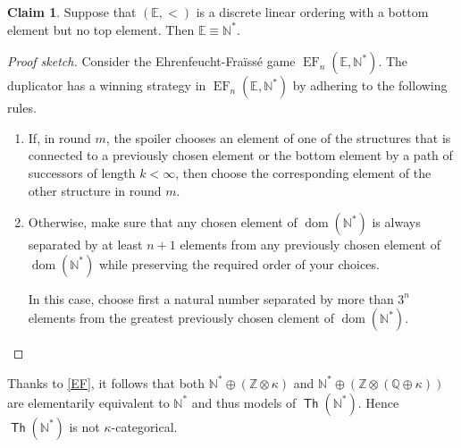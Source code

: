 \documentclass[10pt,letterpaper,cm]{nupset}
\theoremstyle{definition}
\theoremstyle{theorem}
\newtheorem{claim}{Claim}
\theoremstyle{remark}
\newcommand{\E}{\mathbb E}
\newcommand{\N}{\mathbb N}
\newcommand{\Q}{\mathbb Q}
\newcommand{\Z}{\mathbb Z}
\newcommand{\1}{\mathbb{1}}
\renewcommand{\i}{\vec i}
\newcommand{\0}{\vec 0}
\DeclareMathOperator{\dom}{dom}
\DeclareMathOperator{\ef}{EF}
\DeclareMathOperator{\thh}{\mathsf{Th}}
\begin{document}
\begin{solution}
\begin{claim}
Suppose that $\left(\E, <\right)$ is a discrete linear ordering with a bottom element but no top element. Then $\E \equiv \N^{\ast}$.
\end{claim}
\begin{proof}[Proof sketch]
Consider the Ehrenfeucht-Fra\"{\i}ss\'e  game $\ef_n(\E, \N^{\ast})$. The duplicator has a winning strategy in $\ef_n(\E, \N^{\ast})$ by adhering to the following rules.
\begin{enumerate}[label=(\roman*)]
\item If, in round $m$, the spoiler chooses an element of one of the structures that is connected to a previously chosen element or the bottom element by a path of successors of length $k<\infty$, then choose the corresponding element of the other structure in round $m$.
\item Otherwise, make sure that any chosen element of $\dom(\N^{\ast})$ is always separated by at least $n+1$ elements from any previously chosen element of $\dom(\N^{\ast})$ while preserving the required order of your choices. 

In this case, choose first a natural number separated by more than $3^n$ elements from the greatest previously chosen clement of $\dom(\N^{\ast})$.
\end{enumerate}
\end{proof}
Thanks to \cref{EF}, it follows that both $ {\N^{\ast}  \oplus \left(\Z \otimes\kappa\right)}$ and ${\N^{\ast}  \oplus  \left(\Z \otimes\left(\Q  \oplus\kappa\right)\right)}$ are elementarily equivalent to $\N^{\ast}$ and thus models of $\thh(\N^{\ast})$. Hence $\thh(\N^{\ast})$ is not $\kappa$-categorical. 
\end{solution}
\end{document}
